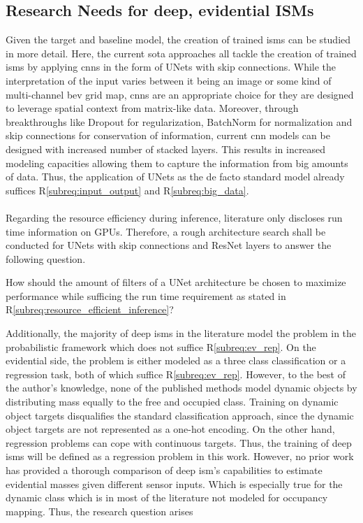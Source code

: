 \subsection{Research Needs for deep, evidential ISMs}
\label{subsec:research_needs_for_deep_isms}
Given the target and baseline model, the creation of trained \gls{ism}s can be studied in more detail. Here, the current \gls{sota} approaches all tackle the creation of trained \gls{ism}s by applying \gls{cnn}s in the form of UNets with skip connections. While the interpretation of the input varies between it being an image or some kind of multi-channel \gls{bev} grid map, \gls{cnn}s are an appropriate choice for they are designed to leverage spatial context from matrix-like data. Moreover, through breakthroughs like Dropout for regularization, BatchNorm for normalization and skip connections for conservation of information, current \gls{cnn} models can be designed with increased number of stacked layers. This results in increased modeling capacities allowing them to capture the information from big amounts of data. Thus, the application of UNets as the de facto standard model already suffices R\ref{subreq:input_output} and R\ref{subreq:big_data}.
\\\\
Regarding the resource efficiency during inference, literature only discloses run time information on GPUs. Therefore, a rough architecture search shall be conducted for UNets with skip connections and ResNet layers to answer the following question.
\\
\begin{requ} \label{requ:network_search}
	How should the amount of filters of a UNet architecture be chosen to maximize performance while sufficing the run time requirement as stated in R\ref{subreq:resource_efficient_inference}?
\end{requ}
Additionally, the majority of deep \gls{ism}s in the literature model the problem in the probabilistic framework which does not suffice R\ref{subreq:ev_rep}. On the evidential side, the problem is either modeled as a three class classification or a regression task, both of which suffice R\ref{subreq:ev_rep}. However, to the best of the author's knowledge, none of the published methods model dynamic objects by distributing mass equally to the free and occupied class. Training on dynamic object targets disqualifies the standard classification approach, since the dynamic object targets are not represented as a one-hot encoding. On the other hand, regression problems can cope with continuous targets. Thus, the training of deep \gls{ism}s will be defined as a regression problem in this work. However, no prior work has provided a thorough comparison of deep \gls{ism}'s capabilities to estimate evidential masses given different sensor inputs. Which is especially true for the dynamic class which is in most of the literature not modeled for occupancy mapping. Thus, the research question arises 

